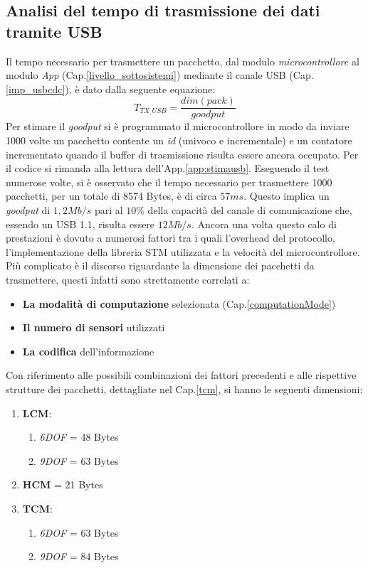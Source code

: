 \subsection{Analisi del tempo di trasmissione dei dati tramite USB}
\label{analisiusb}
Il tempo necessario per trasmettere un pacchetto, dal modulo \textit{microcontrollore} al modulo \textit{App} (Cap.\ref{livello_sottosistemi}) mediante il canale USB (Cap.\ref{imp_usbcdc}), è dato dalla seguente equazione:
\begin{equation}
\label{tx_usb}
T_{TX\_USB}=  \frac{dim(pack)}{goodput}
\end{equation}
Per stimare il \textit{goodput} si è programmato il microcontrollore in modo da inviare 1000 volte un pacchetto contente un \textit{id} (univoco e incrementale) e un contatore incrementato quando il buffer di trasmissione risulta essere ancora occupato. Per il codice si rimanda alla lettura dell'App.\ref{app:stimausb}.
Eseguendo il test numerose volte, si è osservato che il tempo necessario per trasmettere 1000 pacchetti, per un totale di 8574 Bytes, è di circa $57 ms$. 
Questo implica un \textit{goodput} di $1,2 Mb/s$ pari al $10\%$ della capacità del canale di comunicazione che, essendo un USB 1.1, risulta essere $12 Mb/s$. Ancora una volta questo calo di prestazioni è dovuto a numerosi fattori tra i quali l'overhead del protocollo, l'implementazione della libreria STM utilizzata e la velocità del microcontrollore.\\
Più complicato è il discorso riguardante la dimensione dei pacchetti da trasmettere, questi infatti sono strettamente correlati a:
 \begin{itemize}
 	\item \textbf{La modalità di computazione} selezionata (Cap.\ref{computationMode})
 	\item \textbf{Il numero di sensori} utilizzati
 	\item \textbf{La codifica} dell'informazione
  \end{itemize}

Con riferimento alle possibili combinazioni dei fattori precedenti e alle rispettive strutture dei pacchetti, dettagliate nel Cap.\ref{tcm}, si hanno le seguenti dimensioni: 
\begin{enumerate}
	\item \textbf{LCM}:
		\begin{enumerate}
		\item \textit{6DOF} = 48 Bytes
		\item \textit{9DOF} = 63 Bytes
		\end{enumerate}
	\item \textbf{HCM} = 21 Bytes
	\item \textbf{TCM}:
			\begin{enumerate}
			\item \textit{6DOF} = 63 Bytes
			\item \textit{9DOF} = 84 Bytes
			\end{enumerate}
\end{enumerate}

